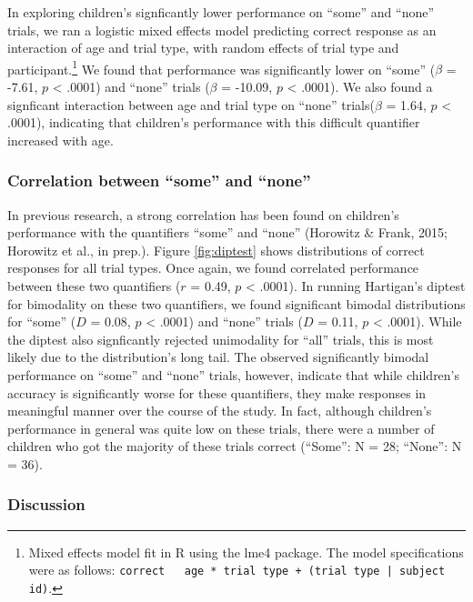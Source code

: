\documentclass[10pt, letterpaper]{article}
\begin{document}
In exploring children's signficantly lower performance on ``some'' and
``none'' trials, we ran a logistic mixed effects model predicting
correct response as an interaction of age and trial type, with random
effects of trial type and
participant.\footnote{Mixed effects model fit in R using the lme4 package. The model specifications were as follows: \texttt{correct ~ age * trial type + (trial type | subject id)}.}
We found that performance was significantly lower on ``some'' (\(\beta\)
= -7.61, \(p\) \textless{} .0001) and ``none'' trials (\(\beta\) =
-10.09, \(p\) \textless{} .0001). We also found a signficant interaction
between age and trial type on ``none'' trials(\(\beta\) = 1.64, \(p\)
\textless{} .0001), indicating that children's performance with this
difficult quantifier increased with age.

\subsubsection{Correlation between ``some'' and
``none''}\label{correlation-between-some-and-none}

In previous research, a strong correlation has been found on children's
performance with the quantifiers ``some'' and ``none'' (Horowitz \&
Frank, 2015; Horowitz et al., in prep.). Figure \ref{fig:diptest} shows
distributions of correct responses for all trial types. Once again, we
found correlated performance between these two quantifiers (\(r\) =
0.49, \(p\) \textless{} .0001). In running Hartigan's diptest for
bimodality on these two quantifiers, we found significant bimodal
distributions for ``some'' (\(D\) = 0.08, \(p\) \textless{} .0001) and
``none'' trials (\(D\) = 0.11, \(p\) \textless{} .0001). While the
diptest also signficantly rejected unimodality for ``all'' trials, this
is most likely due to the distribution's long tail. The observed
significantly bimodal performance on ``some'' and ``none'' trials,
however, indicate that while children's accuracy is significantly worse
for these quantifiers, they make responses in meaningful manner over the
course of the study. In fact, although children's performance in general
was quite low on these trials, there were a number of children who got
the majority of these trials correct (``Some'': N = 28; ``None'': N =
36).

\subsubsection{Discussion}\label{discussion}
\end{document}
